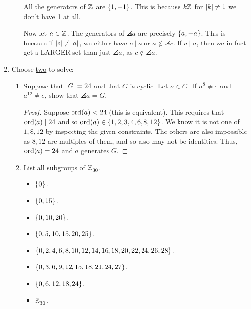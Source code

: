 \documentclass{article}
\begin{document}
\begin{enumerate}[start=1,label={(\arabic*)}]
\begin{enumerate}[start=1,label={(\alph*)}]
                All the generators of $\mathbb{Z}^{}$ are $\lbrace1, -1\rbrace$.
                This is because $k\mathbb{Z}^{}$ for $\lvert k\rvert \ne 1$ we don't have 1 at all.

                Now let $a \in \mathbb{Z}^{}$. The generators of $\angles{a}$ are precisely $\lbrace a, -a\rbrace$.
                This is because if $\lvert c\rvert \ne \lvert a\rvert$, we either have $c \mid a$ or $a \notin \angles{c}$.
                If $c \mid a$, then we in fact get a LARGER set than just $\angles{a}$, as $c \notin \angles{a}$.

        \end{enumerate}

  \item Choose \underline{two} to solve:

        \begin{enumerate}[start=1,label={(\alph*)}]
          \item Suppose that $\lvert G\rvert = 24$ and that $G$ is cyclic.
                Let $a \in G$. If $a^{8} \ne e$ and $a^{12} \ne e$, show that $\angles{a} = G$.

                \begin{proof}
                  Suppose $\operatorname{ord}(a) < 24$ (this is equivalent).
                  This requires that $\operatorname{ord}(a) \mid 24$ and so $\operatorname{ord}(a) \in \lbrace1, 2, 3, 4, 6, 8, 12\rbrace$.
                  We know it is not one of $1, 8, 12$ by inspecting the given constraints.
                  The others are also impossible as $8, 12$ are multiples of them, and so also may not be identities.
                  Thus, $\operatorname{ord}(a) = 24$ and $a$ generates $G$.
                \end{proof}

          \item List all subgroups of $\mathbb{Z}^{}_{30}$.

                \begin{itemize}
                  \item $\lbrace0\rbrace$.
                  \item $\lbrace0, 15\rbrace$.
                  \item $\lbrace0, 10, 20\rbrace$.
                  \item $\lbrace0, 5, 10, 15, 20, 25\rbrace$.
                  \item $\lbrace0, 2, 4, 6, 8, 10, 12, 14, 16, 18, 20, 22, 24, 26, 28\rbrace$.
                  \item $\lbrace0, 3, 6, 9, 12, 15, 18, 21, 24, 27\rbrace$.
                  \item $\lbrace0, 6, 12, 18, 24\rbrace$.
                  \item $\mathbb{Z}^{}_{30}$.
                \end{itemize}


\end{enumerate}
\end{enumerate}
\end{document}
